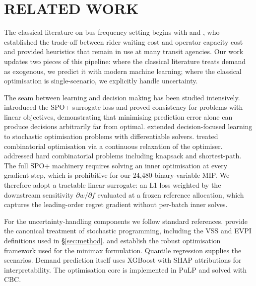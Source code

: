 \documentclass[a4paper,twoside]{article}
\begin{document}
\section{\uppercase{Related Work}}
\label{sec:related}

The classical literature on bus frequency setting begins with
\cite{furth1981setting} and \cite{ceder1986bus}, who established
the trade-off between rider waiting cost and operator capacity
cost and provided heuristics that remain in use at many transit
agencies. Our work updates two pieces of this pipeline: where the
classical literature treats demand as exogenous, we predict it
with modern machine learning; where the classical optimisation is
single-scenario, we explicitly handle uncertainty.

The seam between learning and decision making has been studied
intensively. \cite{elmachtoub2022smart} introduced the SPO+
surrogate loss and proved consistency for problems with linear
objectives, demonstrating that minimising prediction error alone
can produce decisions arbitrarily far from optimal.
\cite{donti2017task} extended decision-focused learning to
stochastic optimisation problems with differentiable solvers.
\cite{wilder2019melding} treated combinatorial optimisation via a
continuous relaxation of the optimiser. \cite{mandi2020smart}
addressed hard combinatorial problems including knapsack and
shortest-path. The full SPO+ machinery requires solving an inner
optimisation at every gradient step, which is prohibitive for our
24{,}480-binary-variable MIP. We therefore adopt a tractable
linear surrogate: an L1 loss weighted by the downstream
sensitivity $\partial w/\partial f$ evaluated at a frozen
reference allocation, which captures the leading-order regret
gradient without per-batch inner solves.

For the uncertainty-handling components we follow standard
references. \cite{birge2011introduction} provide the canonical
treatment of stochastic programming, including the VSS and EVPI
definitions used in \S\ref{sec:method}. \cite{soyster1973convex}
and \cite{bental2002robust} establish the robust optimisation
framework used for the minimax formulation. Quantile regression
\cite{koenker1978regression} supplies the scenarios. Demand
prediction itself uses XGBoost \cite{chen2016xgboost} with SHAP
attributions \cite{lundberg2017unified} for interpretability.
The optimisation core is implemented in PuLP \cite{pulp} and
solved with CBC.
\end{document}
